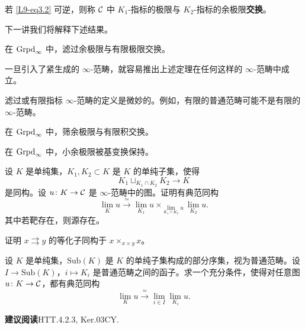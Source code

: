 \begin{definition}\label{L9-3.5}
若 \eqref{L9-eq3.2} 可逆，则称 $\mathcal{C}$ 中 $K_1$-指标的极限与 $K_2$-指标的余极限\textbf{交换}。
\end{definition}

\nitem\label{L9-3.6} 下一讲我们将解释下述结果。

\begin{theorem}\label{L9-3.7}
在 $\operatorname{Grpd}_\infty$ 中，滤过余极限与有限极限交换。
\end{theorem}

\begin{remark}\label{L9-3.8}
一旦引入了紧生成的 $\infty$-范畴，就容易推出上述定理在任何这样的 $\infty$-范畴中成立。
\end{remark}

\begin{warning}\label{L9-3.9}
滤过或有限指标 $\infty$-范畴的定义是微妙的。例如，有限的普通范畴可能不是有限的 $\infty$-范畴。
\end{warning}

\begin{theorem}\label{L9-3.10}
在 $\operatorname{Grpd}_\infty$ 中，筛余极限与有限积交换。
\end{theorem}

\begin{theorem}\label{L9-3.11}
在 $\operatorname{Grpd}_\infty$ 中，小余极限被基变换保持。
\end{theorem}


\begin{exercise}\label{L9-A.1}
设 $K$ 是单纯集，$K_1,K_2\subset K$ 是 $K$ 的单纯子集，使得
\[
K_1\sqcup_{K_1\cap K_2}K_2\to K
\]
是同构。设 $u\colon K\to\mathcal{C}$ 是 $\infty$-范畴中的图。证明有典范同构
\[
\lim_K u\xrightarrow{\ \simeq\ }\lim_{K_1}u\times_{\lim_{K_1\cap K_2}u}\lim_{K_2}u.
\]
其中若靶存在，则源存在。
\end{exercise}

\begin{exercise}\label{L9-A.2}
证明 $x\rightrightarrows y$ 的等化子同构于 $x\times_{x\times y}x$。
\end{exercise}

\begin{exercise}\label{L9-A.3}
设 $K$ 是单纯集，$\mathrm{Sub}(K)$ 是 $K$ 的单纯子集构成的部分序集，视为普通范畴。设 $I\to\mathrm{Sub}(K)$，$i\mapsto K_i$ 是普通范畴之间的函子。求一个充分条件，使得对任意图 $u\colon K\to\mathcal{C}$，都有典范同构
\[
\lim_K u\xrightarrow{\ \simeq\ }\lim_{i\in I}\lim_{K_i}u.
\]
\end{exercise}

\nitem\label{L9-A.4} \textbf{建议阅读}\quad HTT.4.2.3, Ker.03CY.
